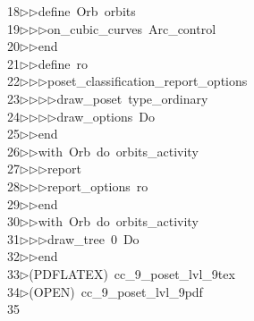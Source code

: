 \begin{tabbing}
18\>$\triangleright$\>$\triangleright$\>define\ Orb\ orbits\ \\[0pt]
19\>$\triangleright$\>$\triangleright$\>$\triangleright$\>on\_cubic\_curves\ Arc\_control\ \\[0pt]
20\>$\triangleright$\>$\triangleright$\>end\ \\[0pt]
21\>$\triangleright$\>$\triangleright$\>define\ ro\ \\[0pt]
22\>$\triangleright$\>$\triangleright$\>$\triangleright$\>poset\_classification\_report\_options\ \\[0pt]
23\>$\triangleright$\>$\triangleright$\>$\triangleright$\>$\triangleright$\>draw\_poset\ type\_ordinary\ \\[0pt]
24\>$\triangleright$\>$\triangleright$\>$\triangleright$\>$\triangleright$\>draw\_options\ Do\ \\[0pt]
25\>$\triangleright$\>$\triangleright$\>end\ \\[0pt]
26\>$\triangleright$\>$\triangleright$\>with\ Orb\ do\ orbits\_activity\ \\[0pt]
27\>$\triangleright$\>$\triangleright$\>$\triangleright$\>report\ \ \\[0pt]
28\>$\triangleright$\>$\triangleright$\>$\triangleright$\>report\_options\ ro\ \\[0pt]
29\>$\triangleright$\>$\triangleright$\>end\\[0pt]
30\>$\triangleright$\>$\triangleright$\>with\ Orb\ do\ orbits\_activity\ \\[0pt]
31\>$\triangleright$\>$\triangleright$\>$\triangleright$\>draw\_tree\ 0\ Do\ \\[0pt]
32\>$\triangleright$\>$\triangleright$\>end\\[0pt]
33\>$\triangleright$\>(PDFLATEX)\ cc\_9\_poset\_lvl\_9tex\\[0pt]
34\>$\triangleright$\>(OPEN)\ cc\_9\_poset\_lvl\_9pdf\\[0pt]
35\>\end{tabbing}
